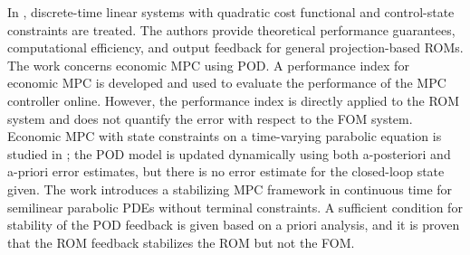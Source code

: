 \documentclass[reqno]{amsart}
\newcommand{\abbr}[1]{\textsf{#1}\xspace}
\newcommand{\PDEs}{\abbr{PDEs}}
\newcommand{\FOM}{\abbr{FOM}}
\newcommand{\ROM}{\abbr{ROM}}
\newcommand{\ROMs}{\abbr{ROMs}}
\newcommand{\MPC}{\abbr{MPC}}
\newcommand{\POD}{\abbr{POD}} %
\begin{document}
%
In \cite{LorMFP22}, discrete-time linear systems with quadratic cost functional and control-state constraints are treated. The authors provide theoretical performance guarantees, computational efficiency, and output feedback for general projection-based \ROMs. The work \cite{grune2021performance} concerns economic \MPC using \POD. A performance index for economic \MPC is developed and used to evaluate the performance of the \MPC controller online. However, the performance index is directly applied to the \ROM system and does not quantify the error with respect to the \FOM system. Economic \MPC with state constraints on a time-varying parabolic equation is studied in \cite{AndGMMPV22}; the \POD model is updated dynamically using both a-posteriori and a-priori error estimates, but there is no error estimate for the closed-loop state given. The work \cite{AllV15} introduces a stabilizing \MPC framework in continuous time for semilinear parabolic \PDEs without terminal constraints. A sufficient condition for stability of the \POD feedback is given based on a priori analysis, and it is proven that the \ROM feedback stabilizes the \ROM but not the \FOM.
%
\end{document}
